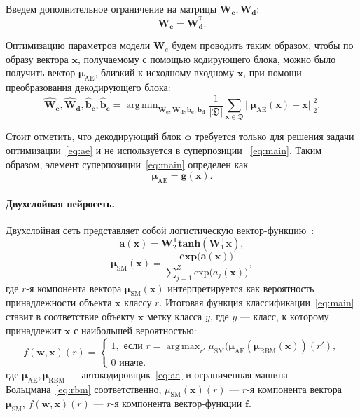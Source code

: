 \documentclass[12pt,notitlepage]{article}
\DeclareMathOperator*{\argmin}{arg\,min}
\DeclareMathOperator*{\argmax}{arg\,max}
\begin{document}
Введем дополнительное ограничение на матрицы $\mathbf{W}_\textbf{e}, \mathbf{W}_\textbf{d}$:
\[
 \mathbf{W}_\textbf{e} = \mathbf{W}_\textbf{d}^{^\text{T}}.
\]

Оптимизацию параметров модели $\mathbf{W}_e$ будем проводить таким образом, чтобы по образу вектора $\mathbf{x}$, получаемому с помощью кодирующего блока, можно было получить вектор $\mathbf{\boldsymbol{\mu}}_\text{AE}$, близкий к исходному входному $\mathbf{x}$, при помощи преобразования декодирующего блока:
\begin{equation}
\label{eq:ae}
 {\hat{\mathbf{W}}}_\textbf{e},\hat{\mathbf{W}}_\textbf{d},\hat{\mathbf{b}}_\textbf{e}, \hat{\mathbf{b}}_\textbf{e} = \argmin_{{\mathbf{W}}_\textbf{e},{\mathbf{W}}_\textbf{d},{\mathbf{b}}_\textbf{e}, {\mathbf{b}}_\textbf{d}} \frac{1}{|\mathfrak{D}|}\sum_{\mathbf{x} \in \mathfrak{D}} ||\mathbf{\boldsymbol{\mu}}_\text{AE}(\mathbf{x})-\mathbf{x}||^2_2.
\end{equation}

Стоит отметить, что декодирующий блок $\boldsymbol{\phi}$ требуется только для решения задачи оптимизации~\eqref{eq:ae} и не используется в суперпозиции ~\eqref{eq:main}. Таким образом, элемент суперпозиции~\eqref{eq:main} определен как
\[
	\mathbf{\boldsymbol{\mu}}_\text{AE} = \mathbf{g}(\mathbf{x}).
\]
\paragraph{Двухслойная нейросеть.}
Двухслойная сеть представляет собой логистическую вектор-функцию~\cite{sm}:
\begin{equation}
\label{sm}
 \mathbf{a}(\mathbf{x}) = \mathbf{W}^\mathsf{T}_2 \textbf{tanh}(\mathbf{W}^\mathsf{T}_1 \mathbf{x}),
\end{equation}
\[
 \mathbf{\boldsymbol{\mu}}_\text{SM}(\mathbf{x}) = \frac{\textbf{exp}\bigl(\mathbf{a}(\mathbf{x})\bigr)}{\sum_{j=1}^Z \text{exp}\bigl({a}_j(\mathbf{x})\bigr)},
\]
где $r$-я компонента вектора $\mathbf{\boldsymbol{\mu}}_\text{SM}(\mathbf{x})$ интерпретируется как вероятность принадлежности объекта $\mathbf{x}$ классу $r$. Итоговая функция классификации~\eqref{eq:main} ставит в соответствие  объекту $\mathbf{x}$ метку класса $y$, где $y$ --- класс, к которому принадлежит $\mathbf{x}$ с наибольшей вероятностью:
$$
 f(\mathbf{w},\mathbf{x})(r) = \begin{cases}
  1,\text{ если }r = \argmax_{r'} {\mu}_\text{SM}(\mathbf{\boldsymbol{\mu}}_\text{AE}(\mathbf{\boldsymbol{\mu}}_\text{RBM}(\mathbf{x}))(r'),\\
  0 \text{ иначе.}
	\end{cases}
$$
где $\mathbf{\boldsymbol{\mu}}_\text{AE}, \mathbf{\boldsymbol{\mu}}_\text{RBM}$ --- автокодировщик~\eqref{eq:ae} и ограниченная машина Больцмана~\eqref{eq:rbm} соответственно, ${\mu}_\text{SM}(\mathbf{x})(r)$ --- $r$-я компонента вектора $ \mathbf{\boldsymbol{\mu}}_\text{SM}$, $f(\mathbf{w},\mathbf{x})(r)$ --- $r$-я компонента вектор-функции $\mathbf{f}$.
\end{document}
